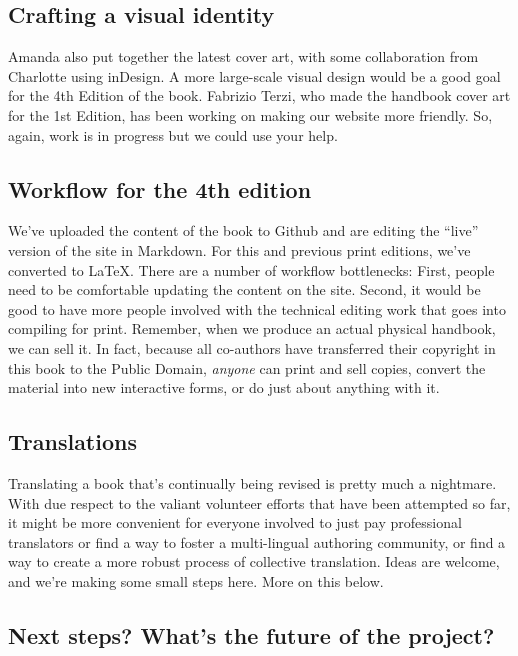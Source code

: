 \subsection{Crafting a visual
identity}\label{crafting-a-visual-identity}

Amanda also put together the latest cover art, with some collaboration
from Charlotte using inDesign. A more large-scale visual design would be
a good goal for the 4th Edition of the book. Fabrizio Terzi, who made
the handbook cover art for the 1st Edition, has been working on making
our website more friendly. So, again, work is in progress but we could
use your help.

\subsection{Workflow for the 4th
edition}\label{workflow-for-the-4th-edition}

We've uploaded the content of the book to Github and are editing the
``live'' version of the site in Markdown. For this and previous print
editions, we've converted to LaTeX. There are a number of workflow
bottlenecks: First, people need to be comfortable updating the content
on the site. Second, it would be good to have more people involved with
the technical editing work that goes into compiling for print. Remember,
when we produce an actual physical handbook, we can sell it. In fact,
because all co-authors have transferred their copyright in this book to
the Public Domain, \emph{anyone} can print and sell copies, convert the
material into new interactive forms, or do just about anything with it.

\subsection{Translations}\label{translations}

Translating a book that's continually being revised is pretty much a
nightmare. With due respect to the valiant volunteer efforts that have
been attempted so far, it might be more convenient for everyone involved
to just pay professional translators or find a way to foster a
multi-lingual authoring community, or find a way to create a more robust
process of collective translation. Ideas are welcome, and we're making
some small steps here. More on this below.

\subsection{Next steps? What's the future of the
project?}\label{next-steps-whats-the-future-of-the-project}

